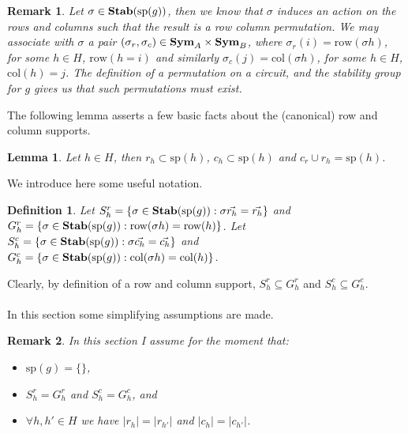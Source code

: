 \documentclass[12pt]{report}
\newtheorem{remark}{Remark} \newtheorem{definition}{Definition}
\newtheorem{lem}[thm]{Lemma} \newtheorem{prop}[thm]{Proposition}
\newcommand{\stab}{\text{\textbf{Stab}}}
\newcommand{\sym}{\text{\textbf{Sym}}}
\newcommand{\consp}{\text{sp}}
\newcommand{\row}{\text{row}}
\newcommand{\column}{\text{col}}
\newcommand{\spstab}[1]{\stab (\consp (#1))}
\begin{document}
\begin{remark}
  Let $\sigma \in \spstab{g}$, then we know that $\sigma$ induces an action on
  the rows and columns such that the result is a row column permutation. We may
  associate with $\sigma$ a pair $(\sigma_r, \sigma_c) \in \sym_A \times
  \sym_B$, where $\sigma_r (i) = \row (\sigma h)$, for some $h \in H$, $\row (h
  = i)$ and similarly $\sigma_c (j) = \column (\sigma h)$, for some $h \in H$,
  $\column (h) = j$. The definition of a permutation on a circuit, and the
  stability group for $g$ gives us that such permutations must exist.
\end{remark}

The following lemma asserts a few basic facts about the (canonical) row and
column supports.

\begin{lem}
  Let $h \in H$, then $r_h \subset \consp(h)$, $c_h \subset \consp(h)$ and $c_r
  \cup r_h = \consp(h)$.
\end{lem}

We introduce here some useful notation.

\begin{definition}
  Let $S^r_h = \{ \sigma \in \stab (\consp(g)) : \sigma \vec{r_h} = \vec{r_h}
  \}$ and $G^r_h = \{ \sigma \in \stab(\consp(g)) : \row(\sigma h) = \row(h)\}$.
  Let $S^c_h = \{ \sigma \in \stab (\consp(g)) : \sigma \vec{c_h} = \vec{c_h}
  \}$ and $G^c_h = \{ \sigma \in \stab(\consp(g)) : \column(\sigma h) =
  \column(h)\}$.
\end{definition}

Clearly, by definition of a row and column support, $S^r_h \subseteq G^r_h$ and
$S^c_h \subseteq G^c_h$.
\\~\\
In this section some simplifying assumptions are made.

\begin{remark}
  In this section I assume for the moment that:
  \begin{itemize}
  \item $\consp (g) = \{\}$,
  \item $S^r_h = G^r_h$ and $S^c_h = G^c_h$, and
  \item $\forall h,h' \in H$ we have $\vert r_h \vert = \vert r_{h'} \vert$ and
    $\vert c_h \vert = \vert c_{h'} \vert$.
  \end{itemize}
\end{remark}
\end{document}
